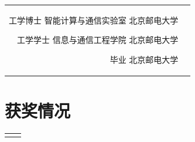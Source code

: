 \documentclass[10pt]{article} %
\begin{document}
\begin{paracol}{2}
\begin{supertabular}{rl}
		
		{工学博士} %
		{} %
		{智能计算与通信实验室} %
		{北京邮电大学} %
		
		
		{工学学士} %
		{} %
		{信息与通信工程学院} %
		{北京邮电大学} %
		
		{毕业} %
		{} %
		{} %
		{北京邮电大学} %
	\end{supertabular}
	
	
	\section{获奖情况}
	
	
	
	
	
	\begin{supertabular}{rl} %
		
		
		
		
		

\end{supertabular}
\end{paracol}
\end{document}
